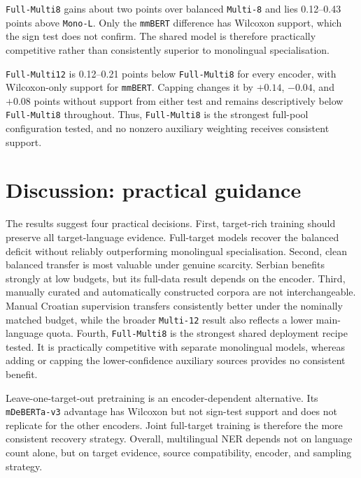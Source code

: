 \documentclass{article}
\begin{document}
\texttt{Full-Multi8} gains about two points over balanced \texttt{Multi-8} and lies 0.12--0.43 points above \texttt{Mono-L}.
Only the \texttt{mmBERT} difference has Wilcoxon support, which the sign test does not confirm.
The shared model is therefore practically competitive rather than consistently superior to monolingual specialisation.

\texttt{Full-Multi12} is 0.12--0.21 points below \texttt{Full-Multi8} for every encoder, with Wilcoxon-only support for \texttt{mmBERT}.
Capping changes it by $+0.14$, $-0.04$, and $+0.08$ points without support from either test and remains descriptively below \texttt{Full-Multi8} throughout.
Thus, \texttt{Full-Multi8} is the strongest full-pool configuration tested, and no nonzero auxiliary weighting receives consistent support.

\section{Discussion: practical guidance}
\label{sec:discussion}

The results suggest four practical decisions.
First, target-rich training should preserve all target-language evidence. Full-target models recover the balanced deficit without reliably outperforming monolingual specialisation.
Second, clean balanced transfer is most valuable under genuine scarcity. Serbian benefits strongly at low budgets, but its full-data result depends on the encoder.
Third, manually curated and automatically constructed corpora are not interchangeable. Manual Croatian supervision transfers consistently better under the nominally matched budget, while the broader \texttt{Multi-12} result also reflects a lower main-language quota.
Fourth, \texttt{Full-Multi8} is the strongest shared deployment recipe tested. It is practically competitive with separate monolingual models, whereas adding or capping the lower-confidence auxiliary sources provides no consistent benefit.

Leave-one-target-out pretraining is an encoder-dependent alternative. Its \texttt{mDeBERTa-v3} advantage has Wilcoxon but not sign-test support and does not replicate for the other encoders. Joint full-target training is therefore the more consistent recovery strategy.
Overall, multilingual NER depends not on language count alone, but on target evidence, source compatibility, encoder, and sampling strategy.
\end{document}
